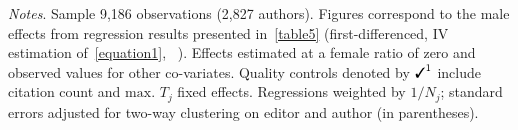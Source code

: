 \begin{table}[H]
\begin{threeparttable}
\begin{tabular}{p{4cm}S@{}S@{}S@{}S@{}S@{}}
            \bottomrule
        \end{tabular}
        \begin{tablenotes}
            \tiny
            \item \textit{Notes}. Sample 9,186 observations (2,827 authors). Figures correspond to the male effects from regression results presented in~\autoref{table5} (first-differenced, IV estimation of~\autoref{equation1}, ~\citet{Arellano1995,Blundell1998}). Effects estimated at a female ratio of zero and observed values for other co-variates. Quality controls denoted by \(\text{\ding{51}}^1\) include citation count and \(\text{max. }T_j\) fixed effects. Regressions weighted by \(1/N_j\); standard errors adjusted for two-way clustering on editor and author (in parentheses).
        \end{tablenotes}
    \end{threeparttable}
\end{table}